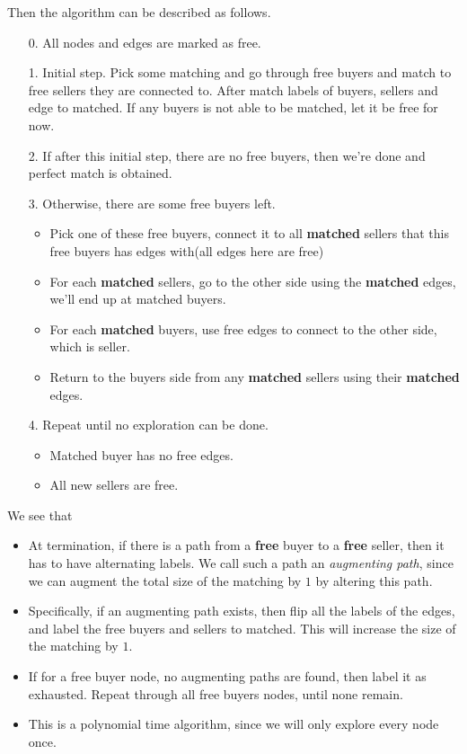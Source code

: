 Then the algorithm can be described as follows.
\begin{enumerate}
	\item[0.] All nodes and edges are marked as free.
	\item[1.] Initial step. Pick some matching and go through free buyers and match to free sellers they are connected to.
		After match labels of buyers, sellers and edge to matched. If any buyers is not able to be matched, let it be free for now.
	\item[2.] If after this initial step, there are no free buyers, then we're done and perfect match is obtained.
	\item[3.] Otherwise, there are some free buyers left.
		\begin{itemize}
			\item Pick one of these free buyers, connect it to all \textbf{matched} sellers that this free buyers has edges with(all edges here are free)
			\item For each \textbf{matched} sellers, go to the other side using the \textbf{matched} edges, we'll end up at matched buyers.
			\item For each \textbf{matched} buyers, use free edges to connect to the other side, which is seller.
			\item Return to the buyers side from any \textbf{matched} sellers using their \textbf{matched} edges.
		\end{itemize}
	\item[4.] Repeat until no exploration can be done.
		\begin{itemize}
			\item Matched buyer has no free edges.
			\item All new sellers are free.
		\end{itemize}
\end{enumerate}
\begin{remark}
	We see that
	\begin{itemize}
		\item At termination, if there is a path from a \textbf{free} buyer to a \textbf{free} seller, then it has to have alternating labels. We
		      call such a path an \emph{augmenting path}, since we can augment the total size of the matching by \(1\) by altering this path.
		\item Specifically, if an augmenting path exists, then flip all the labels of the edges, and label the free buyers and sellers to matched. This
		      will increase the size of the matching by \(1\).
		\item If for a free buyer node, no augmenting paths are found, then label it as exhausted. Repeat through all free buyers nodes, until none remain.
		\item This is a polynomial time algorithm, since we will only explore every node once.
	\end{itemize}
\end{remark}

